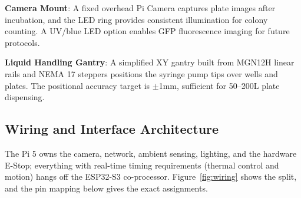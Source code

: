 \documentclass[11pt,letterpaper]{article}
\begin{document}
\textbf{Camera Mount}: A fixed overhead Pi Camera captures plate images after incubation, and the LED ring provides consistent illumination for colony counting. A UV/blue LED option enables GFP fluorescence imaging for future protocols.

\textbf{Liquid Handling Gantry}: A simplified XY gantry built from MGN12H linear rails and NEMA 17 steppers positions the syringe pump tips over wells and plates. The positional accuracy target is $\pm$1mm, sufficient for 50--200\textmu{}L plate dispensing.


\subsection{Wiring and Interface Architecture}

The Pi 5 owns the camera, network, ambient sensing, lighting, and the hardware E-Stop; everything with real-time timing requirements (thermal control and motion) hangs off the ESP32-S3 co-processor. Figure~\ref{fig:wiring} shows the split, and the pin mapping below gives the exact assignments.
\end{document}
